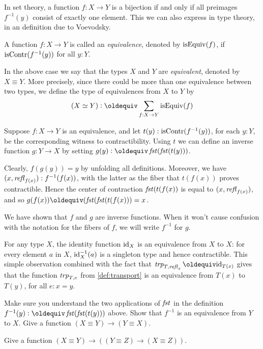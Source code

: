 In set theory, a function $f : X \to Y$ is a bijection if and only if
all preimages $f^{-1}(y)$ consist of exactly one element.
This we can also express in type theory, in an definition due
to Voevodsky. 

\begin{definition}
  \label{def:equivalence}
  A function $f : X \to Y$ is called an \emph{equivalence},
  denoted by $\mathrm{isEquiv}(f)$, if $\mathrm{isContr}(f^{-1}(y))$ for all $y:Y$.
\end{definition}

In the above case we say that the types
$X$ and $Y$ are \emph{equivalent}, denoted by $X\equiv Y$. 
More precisely, since there could be more than one equivalence
between two types, we define the type of equivalences from $X$ to $Y$ by
\[
(X\equiv Y) \defeq \sum_{f:X\to Y} \isEq(f) 
\]

Suppose $f:X \to Y$ is an equivalence, and let $t(y): \mathrm{isContr}(f^{-1}(y))$, for each $y:Y$, be the corresponding witness to contractibility.
Using $t$ we can define an inverse function $g : Y \to X$ by setting $g(y)\defeq\fst(\fst(t(y)))$.

Clearly, $f(g(y)) = y$ by unfolding all definitions.
Moreover, we have $(x,\mathop{{\it refl}_{f(x)}}) : f^{-1}(f(x))$,
with the latter as the fiber that $t(f(x))$
proves contractible. Hence the center of contraction
$\mathop{\mathit{fst}}(t(f(x))$ is equal to $(x,\mathop{{\it refl}_{f(x)}})$, and so
$g(f(x))\jdeq(\fst(\fst(t(f(x))) = x$.

We have shown that $f$ and $g$ are inverse functions.  When it won't cause confusion with the notation for the fibers of $f$, we will write
$f^{-1}$ for $g$.

For any type $X$, the identity function $\mathord{\mathrm{id}}_X$ is an
equivalence from $X$ to $X$: for every element $a$ in $X$,
$\mathord{\mathrm{id}}_X^{-1}(a)$ is a singleton type and hence contractible.
This simple observation combined with the fact that
$\trp{T,\refl{x}}\jdeq \id_{T(x)}$ gives that
the function $\mathop{\mathit{trp}_{T,e}}$ from \cref{def:transport}
is an equivalence from $T(x)$ to $T(y)$, for all $e: x=y$.

\begin{xca}\label{xca:equivalence-invers}
Make sure you understand the two applications of $\mathop{\mathit{fst}}$
in the definition $f^{-1}(y)\defeq\fst(\fst(t(y)))$ above.
Show that $f^{-1}$ is an equivalence from $Y$ to $X$.
Give a function $(X\equiv Y) \to (Y\equiv X)$.
\end{xca}

\begin{xca}\label{xca:equivalence-comp}
Give  a function $(X\equiv Y) \to ((Y\equiv Z) \to (X\equiv Z))$.
\end{xca}

